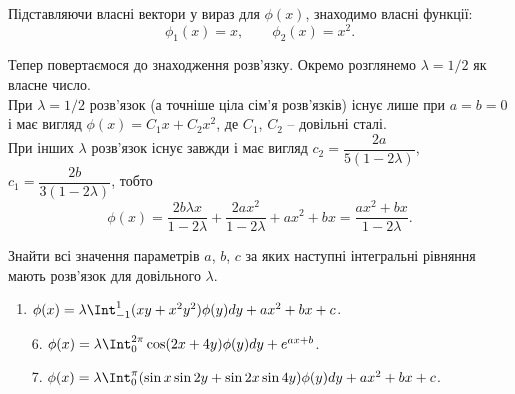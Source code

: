 \begin{solution}
\begin{enumerate}
        Підставляючи власні вектори у вираз для $\phi(x)$, знаходимо власні функції:
        \[ \phi_1(x) = x, \qquad \phi_2(x) = x^2. \]
        
        Тепер повертаємося до знаходження розв'язку. Окремо розглянемо $\lambda = 1 / 2$ як власне число.\\
        
        При $\lambda = 1 / 2$ розв'язок (а точніше ціла сім'я розв'язків) існує лише при $a = b = 0$ і має вигляд $\phi(x) = C_1 x + C_2 x^2$, де $C_1$, $C_2$ -- довільні сталі. \\
        
        При інших $\lambda$ розв'язок існує завжди і має вигляд $c_2 = \dfrac{2a}{5(1 - 2 \lambda)}$, $c_1 = \dfrac{2b}{3(1 - 2 \lambda)}$, тобто 
        \[ \phi(x) = \dfrac{2 b \lambda x}{1 - 2 \lambda} + \dfrac{2 a x^2}{1 - 2 \lambda} + ax^2 + bx = \dfrac{ax^2 + bx}{1 - 2 \lambda}. \]
    \end{enumerate}
\end{solution}

\begin{problem}[5.26, Владимиров]
    Знайти всі значення параметрів $a$, $b$, $c$ за яких наступні інтегральні рівняння мають розв'язок для довільного $\lambda$.
    \begin{enumerate}
        \item $\phi(x) = \lambda \Int_{-1}^1 (xy + x^2y^2) \phi(y) dy + ax^2 + bx + c$.
        \item[6.] $\phi(x) = \lambda \Int_0^{2\pi} \cos(2x + 4y) \phi(y) dy + e^{ax + b}$.
        \item[7.] $\phi(x) = \lambda \Int_0^\pi (\sin x \sin 2y + \sin 2x \sin 4y) \phi(y) dy + ax^2 + bx + c$.
    \end{enumerate}
\end{problem}

